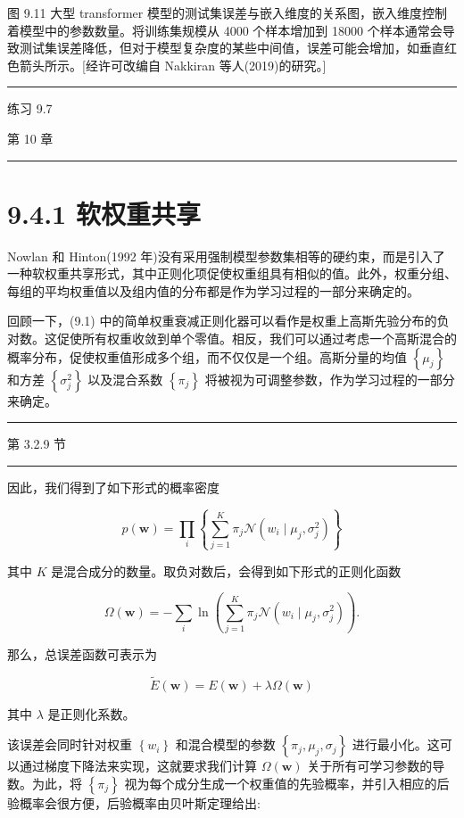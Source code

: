 \documentclass[10pt]{article}
\newcommand{\HRule}{\begin{center}\rule{0.9\linewidth}{0.2mm}\end{center}}
\begin{document}
图 9.11 大型 transformer 模型的测试集误差与嵌入维度的关系图，嵌入维度控制着模型中的参数数量。将训练集规模从 4000 个样本增加到 18000 个样本通常会导致测试集误差降低，但对于模型复杂度的某些中间值，误差可能会增加，如垂直红色箭头所示。[经许可改编自 Nakkiran 等人(2019)的研究。]

\HRule

练习 9.7

第 10 章

\HRule

\section*{9.4.1 软权重共享}

Nowlan 和 Hinton(1992 年)没有采用强制模型参数集相等的硬约束，而是引入了一种软权重共享形式，其中正则化项促使权重组具有相似的值。此外，权重分组、每组的平均权重值以及组内值的分布都是作为学习过程的一部分来确定的。

回顾一下，(9.1) 中的简单权重衰减正则化器可以看作是权重上高斯先验分布的负对数。这促使所有权重收敛到单个零值。相反，我们可以通过考虑一个高斯混合的概率分布，促使权重值形成多个组，而不仅仅是一个组。高斯分量的均值 \(\left\{  {\mu }_{j}\right\}\) 和方差 \(\left\{  {\sigma }_{j}^{2}\right\}\) 以及混合系数 \(\left\{  {\pi }_{j}\right\}\) 将被视为可调整参数，作为学习过程的一部分来确定。

\HRule

第 3.2.9 节

\HRule

因此，我们得到了如下形式的概率密度

\[
p\left( \mathbf{w}\right)  = \mathop{\prod }\limits_{i}\left\{  {\mathop{\sum }\limits_{{j = 1}}^{K}{\pi }_{j}\mathcal{N}\left( {{w}_{i} \mid  {\mu }_{j},{\sigma }_{j}^{2}}\right) }\right\}   \tag{9.21}
\]

其中 \(K\) 是混合成分的数量。取负对数后，会得到如下形式的正则化函数

\[
\Omega \left( \mathbf{w}\right)  =  - \mathop{\sum }\limits_{i}\ln \left( {\mathop{\sum }\limits_{{j = 1}}^{K}{\pi }_{j}\mathcal{N}\left( {{w}_{i} \mid  {\mu }_{j},{\sigma }_{j}^{2}}\right) }\right) . \tag{9.22}
\]

那么，总误差函数可表示为

\[
\widetilde{E}\left( \mathbf{w}\right)  = E\left( \mathbf{w}\right)  + {\lambda \Omega }\left( \mathbf{w}\right)  \tag{9.23}
\]

其中 \(\lambda\) 是正则化系数。

该误差会同时针对权重 \(\left\{  {w}_{i}\right\}\) 和混合模型的参数 \(\left\{  {{\pi }_{j},{\mu }_{j},{\sigma }_{j}}\right\}\) 进行最小化。这可以通过梯度下降法来实现，这就要求我们计算 \(\Omega \left( \mathbf{w}\right)\) 关于所有可学习参数的导数。为此，将 \(\left\{  {\pi }_{j}\right\}\) 视为每个成分生成一个权重值的先验概率，并引入相应的后验概率会很方便，后验概率由贝叶斯定理给出:
\end{document}
